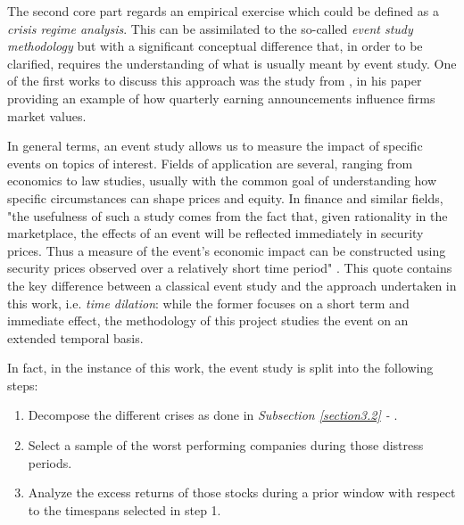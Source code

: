 \documentclass[12pt]{article}
\begin{document}
The second core part regards an empirical exercise which could be defined as a \textit{crisis regime analysis}. This  can be assimilated to the so-called \textit{event study methodology} but with a significant conceptual difference that, in order to be clarified, requires the understanding of what is usually meant by event study. One of the first works to discuss this approach was the study from , in his paper providing an example of how quarterly earning announcements influence firms market values.

In general terms, an event study allows us to measure the impact of specific events on topics of interest. Fields of application are several, ranging from economics to law studies, usually with the common goal of understanding how specific circumstances can shape prices and equity. In finance and similar fields, "the usefulness of such a study comes from the fact that, given rationality in the marketplace, the effects of an event will be reflected immediately in security prices. Thus a measure of the event's economic impact can be constructed using security prices observed over a relatively short time period" \cite{mackinlay1997event}. This quote contains the key difference between a classical event study and the approach undertaken in this work, i.e. \textit{time dilation}: while the former focuses on a short term and immediate effect, the methodology of this project studies the event on an extended temporal basis.

In fact, in the instance of this work, the event study is split into the following steps:
\begin{enumerate}
\item Decompose the different crises as done in \textit{Subsection \ref{section3.2} - }.
\item Select a sample of the worst performing companies during those distress periods.
\item Analyze the excess returns of those stocks during a prior window with respect to the timespans selected in step 1.
\end{enumerate}
\end{document}
